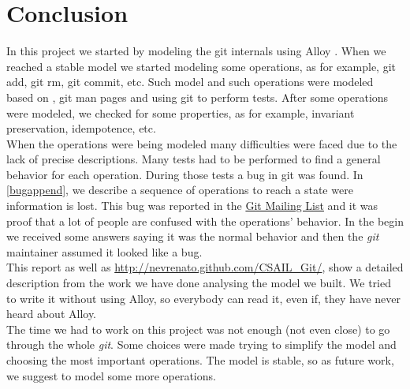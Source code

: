 \section{Conclusion}
In this project we started by modeling the git internals using Alloy
\cite{Jackson:2006:SAL:1146359}. When we reached
a stable model we started modeling some operations, as for example, git
add, git rm, git commit, etc. Such model and such
operations were modeled based on \cite{gitComm}, \cite{progit} git man
pages and using git to perform tests. After some operations were
modeled, we checked for some properties, as for example, invariant
preservation, idempotence, etc.\\

When the operations were being modeled many
difficulties were faced due to the lack of precise descriptions. 
Many tests had to be performed to find a general behavior for each
operation. During those tests a bug in git was found. In
\ref{bugappend}, we describe a
sequence of operations to reach a state were information is lost. This
bug was reported in the \href{mailto:git@vger.kernel.org}{Git Mailing
List} and it was proof that a lot of people are confused with the
operations' behavior. In the begin we received some answers saying it
was the normal behavior and then the \emph{git} maintainer assumed it
looked like a bug.\\

This report as well as
\href{http://nevrenato.github.com/CSAIL_Git/}{http://nevrenato.github.com/CSAIL\_Git/},
show a detailed description from the work we have done analysing the
model we built. We tried to write it without using Alloy, so
everybody can read it, even if, they have never heard about Alloy.\\

The time we had to work on this project was not enough (not even close) to
go through the whole \emph{git}. Some choices were made trying to
simplify the model and choosing the most important operations. The
model is stable, so as future work, we suggest to model some more
operations.
